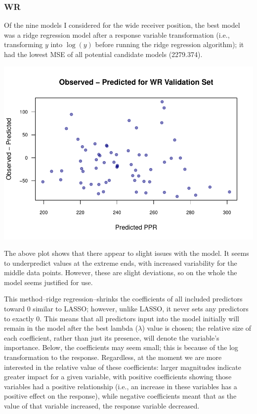 \documentclass[
]{article}
\begin{document}
\hypertarget{wr}{%
\subsubsection{WR}\label{wr}}

Of the nine models I considered for the wide receiver position, the best
model was a ridge regression model after a response variable
transformation (i.e., transforming \(y\) into \(\log(y)\) before running
the ridge regression algorithm); it had the lowest MSE of all potential
candidate models (2279.374).

\begin{center}\includegraphics[width=0.85\linewidth]{stats_199_final_report_files/figure-latex/unnamed-chunk-13-1} \end{center}

The above plot shows that there appear to slight issues with the model.
It seems to underpredict values at the extreme ends, with increased
variability for the middle data points. However, these are slight
deviations, so on the whole the model seems justified for use.

This method--ridge regression--shrinks the coefficients of all included
predictors toward 0 similar to LASSO; however, unlike LASSO, it never
sets any predictors to exactly 0. This means that all predictors input
into the model initially will remain in the model after the best lambda
(\(\lambda\)) value is chosen; the relative size of each coefficient,
rather than just its presence, will denote the variable's importance.
Below, the coefficients may seem small; this is because of the log
transformation to the response. Regardless, at the moment we are more
interested in the relative value of these coefficients: larger
magnitudes indicate greater impact for a given variable, with positive
coefficients showing those variables had a positive relationship (i.e.,
an increase in these variables has a positive effect on the response),
while negative coefficients meant that as the value of that variable
increased, the response variable decreased.
\end{document}

